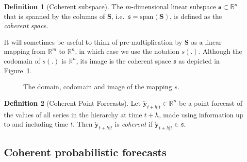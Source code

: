 \documentclass[a4paper, 11pt]{article}
\theoremstyle{definition}
\newtheorem{definition}{Definition}[section]
\begin{document}
\begin{definition}[Coherent subspace]\label{def:cohspace}
 The $m$-dimensional linear subspace $\mathfrak{s}\subset \mathbb{R}^n$ that is spanned by the columns of $\bm{S}$, i.e.\ $\mathfrak{s}=\text{span}(\bm{S})$, is defined as the \emph{coherent space}.
\end{definition}

It will sometimes be useful to think of pre-multiplication by $\bm{S}$ as a linear mapping from $\mathbb{R}^m$ to $\mathbb{R}^n$, in which case we use the notation $s(.)$. Although the codomain of $s(.)$ is $\mathbb{R}^n$, its image is the coherent space $\mathfrak{s}$ as depicted in Figure~\ref{fig2}.

\begin{figure}[H]
  \begin{center}
  \end{center}
  \caption{The domain, codomain and image of the mapping $s$.}\label{fig2}
\end{figure}

\begin{definition}[Coherent Point Forecasts]\label{def:cohpoint}
  Let $\breve{\bm{y}}_{t+h|t} \in \mathbb{R}^n$ be a point forecast of the values of all series in the hierarchy at time $t+h$, made using information up to and including time $t$. Then $\breve{\bm{y}}_{t+h|t}$ is \emph{coherent} if $\breve{\bm{y}}_{t+h|t} \in \mathfrak{s}$.
\end{definition}

\subsection{Coherent probabilistic forecasts}\label{sec:cohprobf}
\end{document}
